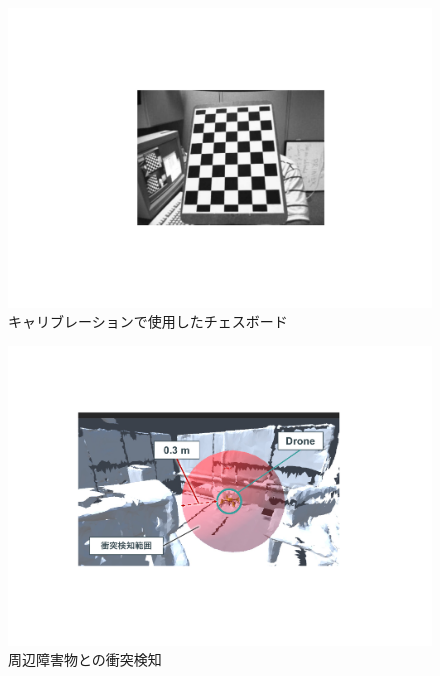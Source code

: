 \documentclass[a4paper,11pt]{ujreport}
\begin{document}
\begin{figure}[!tb]
  \centering
  \includegraphics[width=0.7\linewidth]{img/04_calibration.pdf}
  \caption{キャリブレーションで使用したチェスボード}
  \label{fig:04_calibration}
\end{figure}

\begin{figure}[!tb]
  \centering
  \includegraphics[width=0.7\linewidth]{img/04_warning.pdf}
  \caption{周辺障害物との衝突検知}
  \label{fig:04_warning}
\end{figure}


\end{document}

